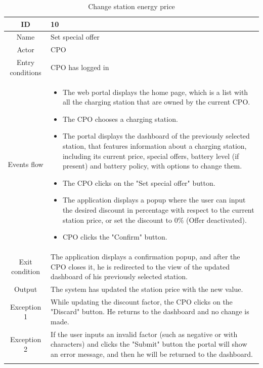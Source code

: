 \begin{longtable}{|c| p{10cm}|}
    \hline ID        & 10\\
    \hline
    Name     & Set special offer \\
    \hline
    Actor            & CPO\\
    \hline
    Entry conditions & CPO has logged in \\
    \hline
    Events flow      & \begin{itemize}[nosep,after=\strut]
        \item The web portal displays the home page, which is a list with all the charging station that are owned by the current CPO.
        \item The CPO chooses a charging station.
        \item The portal displays the dashboard of the previously selected station, that features information about a charging station, including its current price, special offers, battery level (if present) and battery policy, with options to change them.
        \item The CPO clicks on the "Set special offer" button.
        \item The application displays a popup where the user can input the desired discount in percentage with respect to the current station price, or set the discount to 0\% (Offer deactivated).
        \item CPO clicks the "Confirm" button.
    \end{itemize}\\
    \hline
    Exit condition   & The application displays a confirmation popup, and after the CPO closes it, he is redirected to the view of the updated dashboard of his previously selected station.\\
    \hline
    Output           & The system has updated the station price with the new value. 
    \\
    \hline
    \hline
    Exception 1      &  While updating the discount factor, the CPO clicks on the "Discard" button. He returns to the dashboard and no change is made. \\
    \hline
    Exception 2     & If the user inputs an invalid factor (such as negative or with characters) and clicks the "Submit" button the portal will show an error message, and then he will be returned to the dashboard.
    \\
    \hline
    \caption{Change station energy price}\\
\end{longtable}
